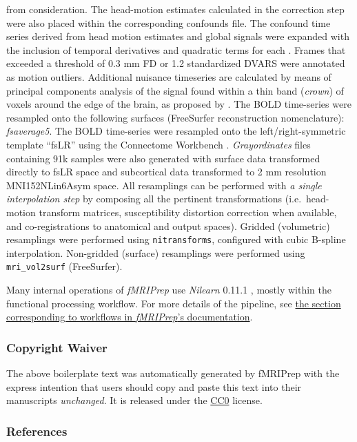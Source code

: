 \documentclass[
]{article}
\begin{document}
\begin{description}
from consideration. The head-motion estimates calculated in the
correction step were also placed within the corresponding confounds
file. The confound time series derived from head motion estimates and
global signals were expanded with the inclusion of temporal derivatives
and quadratic terms for each \citep{confounds_satterthwaite_2013}.
Frames that exceeded a threshold of 0.3 mm FD or 1.2 standardized DVARS
were annotated as motion outliers. Additional nuisance timeseries are
calculated by means of principal components analysis of the signal found
within a thin band (\emph{crown}) of voxels around the edge of the
brain, as proposed by \citep{patriat_improved_2017}. The BOLD
time-series were resampled onto the following surfaces (FreeSurfer
reconstruction nomenclature): \emph{fsaverage5}. The BOLD time-series
were resampled onto the left/right-symmetric template ``fsLR'' using the
Connectome Workbench \citep{hcppipelines}. \emph{Grayordinates} files
\citep{hcppipelines} containing 91k samples were also generated with
surface data transformed directly to fsLR space and subcortical data
transformed to 2 mm resolution MNI152NLin6Asym space. All resamplings
can be performed with \emph{a single interpolation step} by composing
all the pertinent transformations (i.e.~head-motion transform matrices,
susceptibility distortion correction when available, and
co-registrations to anatomical and output spaces). Gridded (volumetric)
resamplings were performed using \texttt{nitransforms}, configured with
cubic B-spline interpolation. Non-gridded (surface) resamplings were
performed using \texttt{mri\_vol2surf} (FreeSurfer).
\end{description}

Many internal operations of \emph{fMRIPrep} use \emph{Nilearn} 0.11.1
\citep[RRID:SCR\_001362]{nilearn}, mostly within the functional
processing workflow. For more details of the pipeline, see
\href{https://fmriprep.readthedocs.io/en/latest/workflows.html}{the
section corresponding to workflows in \emph{fMRIPrep}'s documentation}.

\subsubsection{Copyright Waiver}\label{copyright-waiver}

The above boilerplate text was automatically generated by fMRIPrep with
the express intention that users should copy and paste this text into
their manuscripts \emph{unchanged}. It is released under the
\href{https://creativecommons.org/publicdomain/zero/1.0/}{CC0} license.

\subsubsection{References}\label{references}


\end{document}
